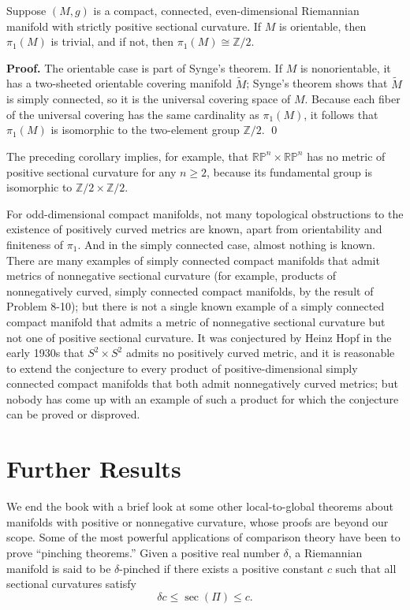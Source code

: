 \begin{corollary}
\label{cor:fundamental-groups-even-dimension}

Suppose $(M,g)$ is a compact, connected, even-dimensional Riemannian manifold with strictly positive sectional curvature. If $M$ is orientable, then $\pi_1(M)$ is trivial, and if not, then $\pi_1(M) \cong \mathbb{Z}/2$.

\textbf{Proof.} The orientable case is part of Synge's theorem. If $M$ is nonorientable, it has a two-sheeted orientable covering manifold $\widetilde{M}$; Synge's theorem shows that $\widetilde{M}$ is simply connected, so it is the universal covering space of $M$. Because each fiber of the universal covering has the same cardinality as $\pi_1(M)$, it follows that $\pi_1(M)$ is isomorphic to the two-element group $\mathbb{Z}/2$. \qed
\end{corollary}

The preceding corollary implies, for example, that $\mathbb{RP}^n \times \mathbb{RP}^n$ has no metric of positive sectional curvature for any $n \geq 2$, because its fundamental group is isomorphic to $\mathbb{Z}/2 \times \mathbb{Z}/2$.

For odd-dimensional compact manifolds, not many topological obstructions to the existence of positively curved metrics are known, apart from orientability and finiteness of $\pi_1$. And in the simply connected case, almost nothing is known. There are many examples of simply connected compact manifolds that admit metrics of nonnegative sectional curvature (for example, products of nonnegatively curved, simply connected compact manifolds, by the result of Problem 8-10); but there is not a single known example of a simply connected compact manifold that admits a metric of nonnegative sectional curvature but not one of positive sectional curvature. It was conjectured by Heinz Hopf in the early 1930s that $S^2 \times S^2$ admits no positively curved metric, and it is reasonable to extend the conjecture to every product of positive-dimensional simply connected compact manifolds that both admit nonnegatively curved metrics; but nobody has come up with an example of such a product for which the conjecture can be proved or disproved.

\section{Further Results}

We end the book with a brief look at some other local-to-global theorems about manifolds with positive or nonnegative curvature, whose proofs are beyond our scope. Some of the most powerful applications of comparison theory have been to prove ``pinching theorems.'' Given a positive real number $\delta$, a Riemannian manifold is said to be $\delta$-pinched if there exists a positive constant $c$ such that all sectional curvatures satisfy
\[
\delta c \leq \sec(\Pi) \leq c.
\]

